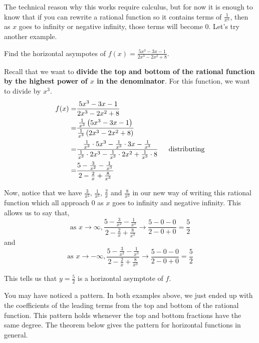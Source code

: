 \documentclass{ximera}
\begin{document}
The technical reason why this works require calculus, but for now it is enough to know that if you can rewrite a rational function so it contains terms of $\frac{1}{x^n}$, then as $x$ goes to infinity or negative infinity, those terms will become $0$.  Let's try another example.

\begin{example}  Find the horizontal asympotes of $f(x) = \frac{5x^3-3x-1}{2x^3-2x^2+8}$.

\begin{explanation}
Recall that we want to \textbf{divide the top and bottom of the rational function by the highest power of $x$ in the denominator}.  For this function, we want to divide by $x^3$.
\begin{align*}
f(x) =& \frac{5x^3-3x-1}{2x^3-2x^2+8}\\
=& \frac{\frac{1}{x^3}\left(5x^3-3x-1\right)}{\frac{1}{x^3}\left(2x^3-2x^2+8\right)} \\
=& \frac{\frac{1}{x^3} \cdot 5x^3-\frac{1}{x^3}\cdot 3x - \frac{1}{x^3}}{\frac{1}{x^3}\cdot 2x^3-\frac{1}{x^3} \cdot 2x^2 + \frac{1}{x^3} \cdot 8} \text{ \, \,\,    distributing} \\
=& \frac{5-\frac{3}{x^2}-\frac{1}{x^3}}{2-\frac{2}{x}+\frac{8}{x^3}} \\
\end{align*}

Now, notice that we have $\frac{3}{x^2}$, $\frac{1}{x^3}$, $\frac{2}{x}$ and $\frac{8}{x^3}$ in our new way of writing this rational function which all approach $0$ as $x$ goes to infinity and negative infinity.  This allows us to say  that,
\[
\text{as } x \rightarrow \infty, \frac{5-\frac{3}{x^2}-\frac{1}{x^3}}{2-\frac{2}{x}+\frac{8}{x^3}} \rightarrow \frac{5-0-0}{2-0+0}=\frac{5}{2}
\]
and
\[
\text{as } x \rightarrow -\infty, \frac{5-\frac{3}{x^2}-\frac{1}{x^3}}{2-\frac{2}{x}+\frac{8}{x^3}} \rightarrow \frac{5-0-0}{2-0+0}=\frac{5}{2}
\]

This tells us that $y=\frac{5}{2}$ is a horizontal asymptote of $f$.
\end{explanation}
\end{example}

You may have noticed a pattern.  In both examples above, we just ended up with the coefficients of the leading terms from the top and bottom of the rational function.  This pattern holds whenever the top and bottom fractions have the same degree.  The theorem below gives the pattern for horizontal functions in general.
\end{document}
